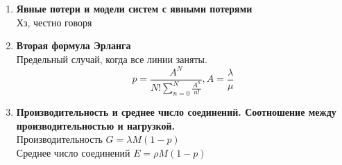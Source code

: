 \documentclass[12pt]{article}
\begin{document}
\begin{enumerate}
	\item \textbf{Явные потери и модели систем с явными потерями} \\
	Хз, честно говоря
	\item \textbf{Вторая формула Эрланга} \\
	Предельный случай, когда все линии заняты.
	\[
	 	p = \frac{A ^ N}
	 	{N!\sum_{n=0}^{N} \frac{A ^ n}{n!}}, A = \frac{\lambda}{\mu}
	\]

	\item \textbf{Производительность и среднее число соединений.
	Соотношение между производительностью и нагрузкой.} \\
		Производительность $G = \lambda M(1-p)$ \\
		Среднее число соединений $E = \rho M(1-p)$

\end{enumerate}
\end{document}
